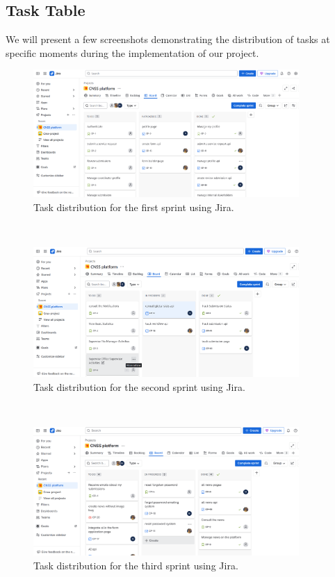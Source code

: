 \subsection{Task Table}
We will present a few screenshots demonstrating the distribution of tasks at specific moments during the implementation of our project.
\begin{figure}[h]
    \centering
    \includegraphics[width=0.9\textwidth]{figures/sprint1 jira.png} 
    \caption{Task distribution for the first sprint using Jira.}
\end{figure}\
\begin{figure}[h]
    \centering
    \includegraphics[width=0.9\textwidth]{figures/sprint2 jira.png} 
    \caption{Task distribution for the second sprint using Jira.}
\end{figure}\
\begin{figure}[h]
    \centering
    \includegraphics[width=0.9\textwidth]{figures/sprint3 jira.png} 
    \caption{Task distribution for the third sprint using Jira.}
\end{figure}\
\clearpage


